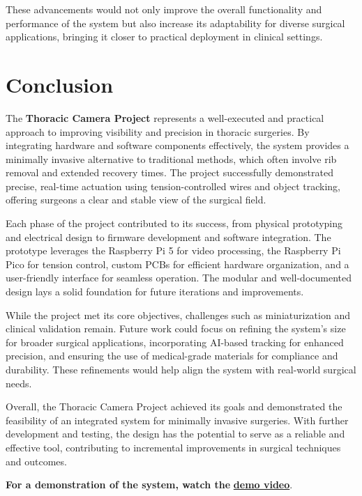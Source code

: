 These advancements would not only improve the overall functionality and performance of the system but also increase its adaptability for diverse surgical applications, bringing it closer to practical deployment in clinical settings.

\section{Conclusion}

The \textbf{Thoracic Camera Project} represents a well-executed and practical approach to improving visibility and precision in thoracic surgeries. By integrating hardware and software components effectively, the system provides a minimally invasive alternative to traditional methods, which often involve rib removal and extended recovery times. The project successfully demonstrated precise, real-time actuation using tension-controlled wires and object tracking, offering surgeons a clear and stable view of the surgical field.

Each phase of the project contributed to its success, from physical prototyping and electrical design to firmware development and software integration. The prototype leverages the Raspberry Pi 5 for video processing, the Raspberry Pi Pico for tension control, custom PCBs for efficient hardware organization, and a user-friendly interface for seamless operation. The modular and well-documented design lays a solid foundation for future iterations and improvements.

While the project met its core objectives, challenges such as miniaturization and clinical validation remain. Future work could focus on refining the system's size for broader surgical applications, incorporating AI-based tracking for enhanced precision, and ensuring the use of medical-grade materials for compliance and durability. These refinements would help align the system with real-world surgical needs.

Overall, the Thoracic Camera Project achieved its goals and demonstrated the feasibility of an integrated system for minimally invasive surgeries. With further development and testing, the design has the potential to serve as a reliable and effective tool, contributing to incremental improvements in surgical techniques and outcomes.


\vspace{0.5cm}
\noindent
\textbf{\normalsize For a demonstration of the system, watch the} \href{https://youtu.be/UekYdXSXzXo}{\textbf{\normalsize demo video}}.
\vspace{0.5cm}



